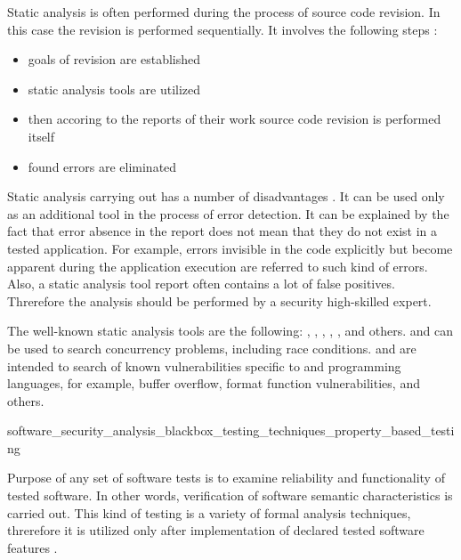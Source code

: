 %
Static analysis is often performed during the process of source code revision. 
%
In this case the revision is performed sequentially. 
It involves the following steps : 
\begin{itemize}
	\item goals of revision are established
	\item static analysis tools are utilized
	\item then accoring to the reports of their work source code revision is performed itself
	\item found errors are eliminated
\end{itemize}

%
Static analysis carrying out has a number of disadvantages  . 
%
It can be used only as an additional tool in the process of error detection. 
%
It can be explained by the fact that error absence in the report does not mean that they do not exist in a tested application. 
%
For example, errors invisible in the code explicitly but become apparent during the application execution are referred to such kind of errors. 
%
Also, a static analysis tool report often contains a lot of false positives. 
%
Threrefore the analysis should be performed by a security high-skilled expert. 

%
The well-known static analysis tools are the following:  ,  ,  ,  ,  , and others.
%
 and  can be used to search concurrency problems, including race conditions. 
%
 and  are intended to search of known vulnerabilities specific to  and  programming languages, for example, buffer overflow, format function vulnerabilities, and others. 


	{software_security_analysis_blackbox_testing_techniques_property_based_testing}

%
Purpose of any set of software tests is to examine reliability and functionality of tested software. 
%
In other words, verification of software semantic characteristics is carried out. 
%
This kind of testing is a variety of formal analysis techniques, threrefore it is utilized only after implementation of declared tested software features . 

